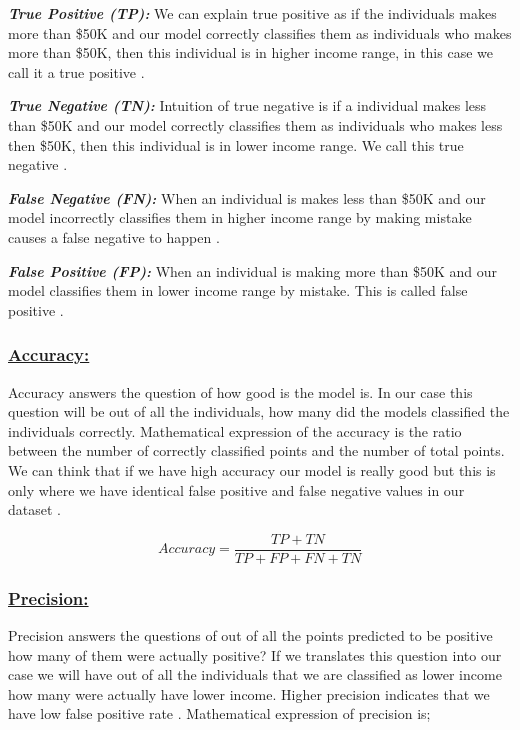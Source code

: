 \documentclass[sigconf]{acmart}
\begin{document}
\par \textbf{\textit{True Positive (TP):}} We can explain true positive as if the individuals makes more than \$50K and our model correctly classifies them as individuals who makes more than \$50K, then this individual is in higher income range, in this case we call it a true positive \cite{www-exsilio}. 

\par \textbf{\textit{True Negative (TN):}} Intuition of true negative is if a individual makes less than \$50K and our model correctly classifies them as individuals who makes less then \$50K, then this individual is in lower income range. We call this true negative \cite{www-exsilio}. 

\par \textbf{\textit{False Negative (FN):}} When an individual is makes less than \$50K and our model incorrectly classifies them in higher income range by making mistake causes a false negative to happen \cite{www-exsilio}.

\par \textbf{\textit{False Positive (FP):}} When an individual is making more than \$50K and our model classifies them in lower income range by mistake. This is called false positive \cite{www-exsilio}. 

\subsubsection{\textbf{\underline{Accuracy:}}}
Accuracy answers the question of how good is the model is. In our case this question will be out of all the individuals, how many did the models classified the individuals correctly. Mathematical expression of the accuracy is the ratio between the number of correctly classified points and the number of total points. We can think that if we have high accuracy our model is really good but this is only where we have identical false positive and false negative values in our dataset \cite{www-exsilio}.

\begin{equation}
Accuracy = \frac{TP + TN} {TP + FP + FN + TN}
\end{equation}

\subsubsection{\textbf{\underline{Precision:}}}
Precision answers the questions of out of all the points predicted to be positive how many of them were actually positive? If we translates this question into our case we will have out of all the individuals that we are classified as lower income how many were actually have lower income. Higher precision indicates that we have low false positive rate \cite{www-exsilio}. Mathematical expression of precision is; 
\end{document}
